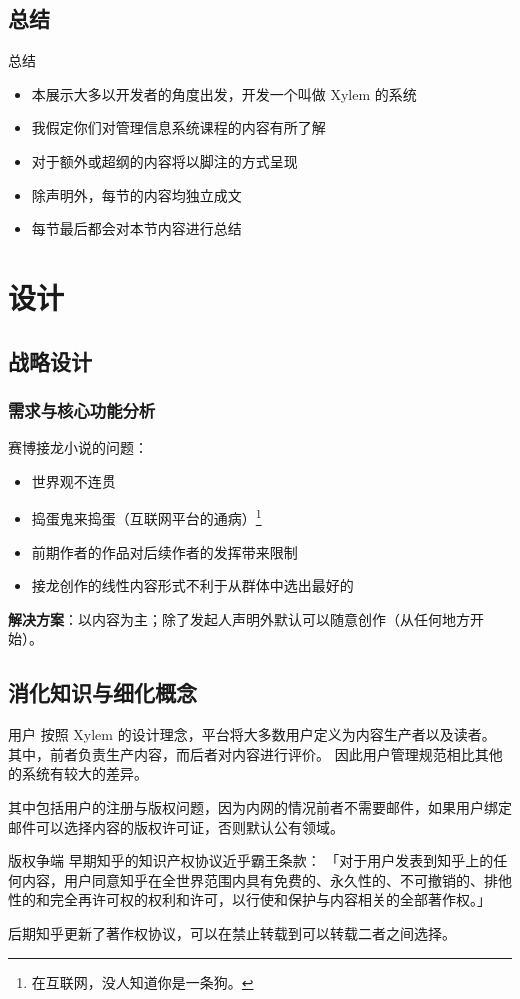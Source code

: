 \documentclass[UTF8]{ctexbeamer}
\begin{document}
\subsection{总结}
\begin{frame}{总结}
\begin{itemize}
  \item 本展示大多以开发者的角度出发，开发一个叫做 Xylem 的系统
  \item 我假定你们对管理信息系统课程的内容有所了解
  \item 对于额外或超纲的内容将以脚注的方式呈现
  \item 除声明外，每节的内容均独立成文
  \item 每节最后都会对本节内容进行总结
\end{itemize}
\end{frame}

\section{设计}

\subsection{战略设计}

\begin{frame}\frametitle{需求与核心功能分析}
赛博接龙小说的问题：
\begin{itemize}
  \item 世界观不连贯
  \item 捣蛋鬼来捣蛋（互联网平台的通病）\footnote[1]{在互联网，没人知道你是一条狗。}
  \item 前期作者的作品对后续作者的发挥带来限制
  \item 接龙创作的线性内容形式不利于从群体中选出最好的
\end{itemize}

\textbf{解决方案}：以内容为主；除了发起人声明外默认可以随意创作（从任何地方开始）。

\end{frame}

\subsection{消化知识与细化概念}

\begin{frame}{用户}
按照 Xylem 的设计理念，平台将大多数用户定义为内容生产者以及读者。
其中，前者负责生产内容，而后者对内容进行评价。
因此用户管理规范相比其他的系统有较大的差异。

其中包括用户的注册与版权问题，因为内网的情况前者不需要邮件，如果用户绑定邮件可以选择内容的版权许可证，否则默认公有领域。
\begin{block}{版权争端}
早期知乎的知识产权协议近乎霸王条款：
「对于用户发表到知乎上的任何内容，用户同意知乎在全世界范围内具有免费的、永久性的、不可撤销的、排他性的和完全再许可权的权利和许可，以行使和保护与内容相关的全部著作权。」

后期知乎更新了著作权协议，可以在禁止转载到可以转载二者之间选择。
\end{block}
\end{frame}
\end{document}
